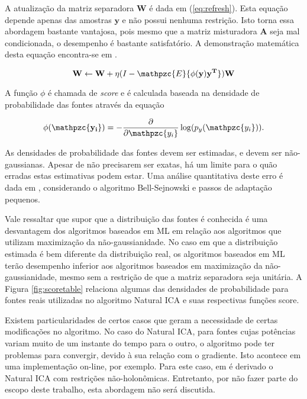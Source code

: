     A atualização da matriz separadora $\mathbf{W}$ é dada em (\ref{eq:refresh}). Esta equação depende apenas das amostras $\mathbf{y}$ e não possui nenhuma restrição. Isto torna essa abordagem bastante vantajosa, pois mesmo que a matriz misturadora $\mathbf{A}$ seja mal condicionada, o desempenho é bastante satisfatório. A demonstração matemática desta equação encontra-se em \cite{ICA3}.
    
    \begin{equation}
    \label{eq:refresh}
    \mathbf{W} \leftarrow \mathbf{W} + \eta(I - \mathpzc{E}\{\phi({\mathbf{y})\mathbf{y^T}}\})\mathbf{W}
    \end{equation}
    
    A função $\phi$ é chamada de \textit{score} e é calculada baseada na densidade de probabilidade das fontes através da equação
    
    \begin{equation}
    \label{eq:score}
    \mathbf{\phi({\mathpzc{y_i}})} = - \frac{\partial}{\partial \mathpzc{y_i}} \log(p_y(\mathpzc{y_i})).
    \end{equation}
    
    As densidades de probabilidade das fontes devem ser estimadas, e devem ser não-gaussianas. Apesar de não precisarem ser exatas, há um limite para o quão erradas estas estimativas podem estar. Uma análise quantitativa deste erro é dada em \cite{ICA3}, considerando o algoritmo Bell-Sejnowski e passos de adaptação pequenos.
    
    Vale ressaltar que supor que a distribuição das fontes é conhecida é uma desvantagem dos algoritmos baseados em ML em relação aos algoritmos que utilizam maximização da não-gaussianidade. No caso em que a distribuição estimada é bem diferente da distribuição real, os algoritmos baseados em ML terão desempenho inferior aos algoritmos baseados em maximização da não-gaussianidade, mesmo sem a restrição de que a matriz separadora seja unitária. A Figura \ref{fig:scoretable} relaciona algumas das densidades de probabilidade para fontes reais utilizadas no algoritmo Natural ICA e suas respectivas funções score.
    
    Existem particularidades de certos casos que geram a necessidade de certas modificações no algoritmo. No caso do Natural ICA, para fontes cujas potências variam muito de um instante do tempo para o outro, o algoritmo pode ter problemas para convergir, devido à sua relação com o gradiente. Isto acontece em uma implementação on-line, por exemplo. Para este caso, em \cite{holonomic} é derivado o Natural ICA com restrições não-holonômicas. Entretanto, por não fazer parte do escopo deste trabalho, esta abordagem não será discutida.


